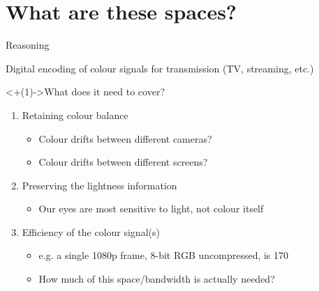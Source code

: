 \documentclass[aspectratio=169,usepdftitle=false]{fireshonks}
\begin{document}
\section{What are these spaces?}
\begin{frame}{Reasoning}
    \begin{center}
        Digital encoding of colour signals for transmission (TV, streaming, etc.)
    \end{center}

    \uncover<+(1)->{What does it need to cover? \autocite{tooms}}
    \begin{enumerate}[<+(1)->]
        \item Retaining colour balance
              \begin{itemize}
                  \item Colour drifts between different cameras? 
                  \item Colour drifts between different screens? 
              \end{itemize}
        \item Preserving the lightness information
              \begin{itemize}
                  \item Our eyes are most sensitive to light, not colour itself
              \end{itemize}
        \item Efficiency of the colour signal(s)
              \begin{itemize}
                  \item e.g. a single 1080p frame, 8-bit RGB uncompressed, is \SI{170}{\mega\byte}
                  \item How much of this space/bandwidth is actually needed?
              \end{itemize}
    \end{enumerate}
\end{frame}
\end{document}
